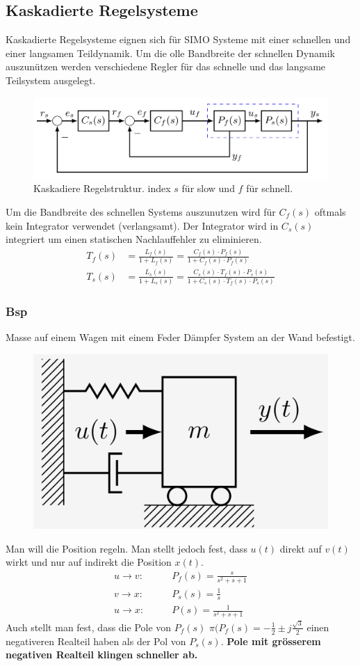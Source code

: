\subsection{Kaskadierte Regelsysteme}
    Kaskadierte Regelsysteme eignen sich für SIMO Systeme mit einer schnellen und einer langsamen Teildynamik. Um die olle Bandbreite der schnellen Dynamik auszunützen werden verschiedene Regler für das schnelle und das langsame Teilsystem ausgelegt.
    
    \begin{figure}[H]
        \centering
        \includegraphics[width = 0.7\linewidth]{images/04/kaskad_sys.jpeg}
        \caption{Kaskadiere Regelstruktur. index $s$ für slow und $f$ für schnell.}
    \end{figure}
    Um die Bandbreite des schnellen Systems auszunutzen wird für $C_f(s)$ oftmals kein Integrator verwendet (verlangsamt). Der Integrator wird in $C_s(s)$ integriert um einen statischen Nachlauffehler zu eliminieren.
    \begin{align*}
        T_{f}(s) &= \frac{L_f(s)}{1 + L_f(s)} = \frac{C_f(s)\cdot P_f(s)}{1 + C_f(s)\cdot P_f(s)}\\
        T_{s}(s) &= \frac{L_s(s)}{1 + L_s(s)} = \frac{C_s(s)\cdot T_{f}(s)\cdot P_s(s)}{1 + C_s(s)\cdot T_f(s) \cdot P_s(s)}
    \end{align*}
    
    \subsubsection{Bsp}
        Masse auf einem Wagen mit einem Feder Dämpfer System an der Wand befestigt.
        \begin{figure}[H]
            \centering
            \includegraphics[width = 0.25\linewidth]{images/04/kask_bsp.jpeg}
        \end{figure}
        Man will die Position regeln. Man stellt jedoch fest, dass $u(t)$ direkt auf $v(t)$ wirkt und nur auf indirekt die Position $x(t)$.
        \begin{align*}
            u\rightarrow v: \qquad &P_f(s) = \frac{s}{s^2+s+1}\\
            v\rightarrow x: \qquad &P_s(s) = \frac{1}{s}\\
            u\rightarrow x: \qquad &P(s) = \frac{1}{s^2+s+1}
        \end{align*}
        Auch stellt man fest, dass die Pole von $P_f(s)$ $\pi(P_f(s) = -\frac{1}{2}\pm j\frac{\sqrt{3}}{2}$ einen negativeren Realteil haben als der Pol von $P_s(s)$. \textbf{Pole mit grösserem negativen Realteil klingen schneller ab.}
        
